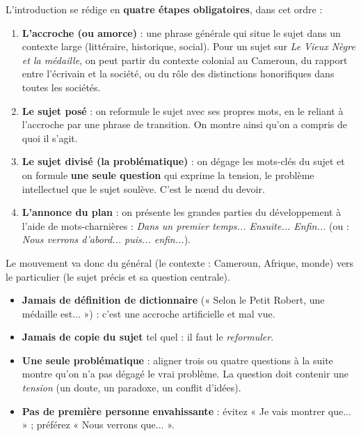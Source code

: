 \documentclass[11pt]{article}
\begin{document}
\begin{methode}
L'introduction se rédige en \textbf{quatre étapes obligatoires}, dans cet ordre :
\begin{enumerate}
\item \textbf{L'accroche (ou amorce)} : une phrase générale qui situe le sujet dans un contexte large (littéraire, historique, social). Pour un sujet sur \emph{Le Vieux Nègre et la médaille}, on peut partir du contexte colonial au Cameroun, du rapport entre l'écrivain et la société, ou du rôle des distinctions honorifiques dans toutes les sociétés.
\item \textbf{Le sujet posé} : on reformule le sujet avec ses propres mots, en le reliant à l'accroche par une phrase de transition. On montre ainsi qu'on a compris de quoi il s'agit.
\item \textbf{Le sujet divisé (la problématique)} : on dégage les mots-clés du sujet et on formule \textbf{une seule question} qui exprime la tension, le problème intellectuel que le sujet soulève. C'est le nœud du devoir.
\item \textbf{L'annonce du plan} : on présente les grandes parties du développement à l'aide de mots-charnières : \emph{Dans un premier temps... Ensuite... Enfin...} (ou : \emph{Nous verrons d'abord... puis... enfin...}).
\end{enumerate}
Le mouvement va donc du général (le contexte : Cameroun, Afrique, monde) vers le particulier (le sujet précis et sa question centrale).
\end{methode}

\begin{attention}
\begin{itemize}
\item \textbf{Jamais de définition de dictionnaire} (« Selon le Petit Robert, une médaille est... ») : c'est une accroche artificielle et mal vue.
\item \textbf{Jamais de copie du sujet} tel quel : il faut le \emph{reformuler}.
\item \textbf{Une seule problématique} : aligner trois ou quatre questions à la suite montre qu'on n'a pas dégagé le vrai problème. La question doit contenir une \emph{tension} (un doute, un paradoxe, un conflit d'idées).
\item \textbf{Pas de première personne envahissante} : évitez « Je vais montrer que... » ; préférez « Nous verrons que... ».
\end{itemize}
\end{attention}
\end{document}
